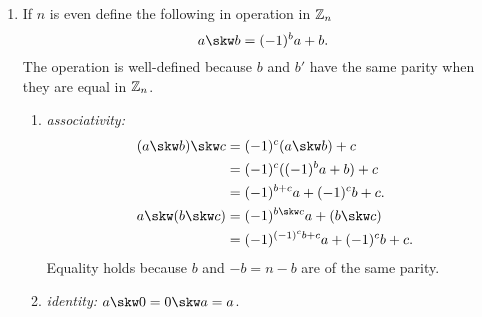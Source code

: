 \begin{xmpls}\label{xmpls:SLB}${}$
\begin{enumerate}[\rm a)]
    \item If $n$ is even define the following in operation in $\mathbb{Z}_n$
    $$
        a\skw b = (-1)^ba + b.
    $$
    The operation is well-defined because $b$ and $b'$ have the same parity when they are equal in $\mathbb{Z}_n$.
    \begin{enumerate}[-]
        \item \textit{associativity:}
            \begin{align*}
                (a\skw b)\skw c &= (-1)^c(a\skw b)+c\\
                    &= (-1)^c((-1)^ba+b)+c\\
                    &= (-1)^{b+c}a + (-1)^cb + c.\\
                a\skw(b\skw c) &= (-1)^{b\skw c}a+(b\skw c)\\
                    &= (-1)^{(-1)^cb+c}a + (-1)^cb+c.
            \end{align*}
            Equality holds because $b$ and $-b=n-b$ are of the same parity.
        \item \textit{identity:} $a\skw0=0\skw a=a$.


\end{enumerate}
\end{enumerate}
\end{xmpls}
